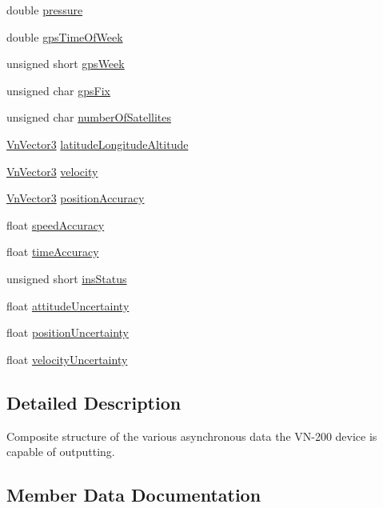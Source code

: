 \begin{DoxyCompactItemize}
\item 
double \hyperlink{structVn200CompositeData_a91264496d6da4aeb32135a1f0e5e03dc}{pressure}
\item 
double \hyperlink{structVn200CompositeData_afdf82529eb5b04077aee739afe317bcf}{gps\+Time\+Of\+Week}
\item 
unsigned short \hyperlink{structVn200CompositeData_acb1f26f310415fe01af3a5251b4b66db}{gps\+Week}
\item 
unsigned char \hyperlink{structVn200CompositeData_a4ad8ffd8bff4d46b04eecea6ed9ecfd5}{gps\+Fix}
\item 
unsigned char \hyperlink{structVn200CompositeData_afbc9fa81db935c26e10708d92464eec2}{number\+Of\+Satellites}
\item 
\hyperlink{structVnVector3}{Vn\+Vector3} \hyperlink{structVn200CompositeData_a0d4021656c0508cafaab079294a89bf3}{latitude\+Longitude\+Altitude}
\item 
\hyperlink{structVnVector3}{Vn\+Vector3} \hyperlink{structVn200CompositeData_a1dc5d5ec41470c01765c925c1d8d876c}{velocity}
\item 
\hyperlink{structVnVector3}{Vn\+Vector3} \hyperlink{structVn200CompositeData_a72dc6d7bad9d88af97e5dbf769e3afe7}{position\+Accuracy}
\item 
float \hyperlink{structVn200CompositeData_ab3c241777e887510c18c944c713eb8a3}{speed\+Accuracy}
\item 
float \hyperlink{structVn200CompositeData_a11c014a5f2a8634e12ac59d7ad3d75f9}{time\+Accuracy}
\item 
unsigned short \hyperlink{structVn200CompositeData_a02f038d8695242bedff6412571e4bd93}{ins\+Status}
\item 
float \hyperlink{structVn200CompositeData_ab20bd8983d5de7e3d42ecf1da48b08d2}{attitude\+Uncertainty}
\item 
float \hyperlink{structVn200CompositeData_ab2c4279bb170d94ab42820b6abf36493}{position\+Uncertainty}
\item 
float \hyperlink{structVn200CompositeData_a5d1a9ba2f962d0dad6ce14537f1a32e3}{velocity\+Uncertainty}
\end{DoxyCompactItemize}


\subsection{Detailed Description}
Composite structure of the various asynchronous data the V\+N-\/200 device is capable of outputting. 

\subsection{Member Data Documentation}
